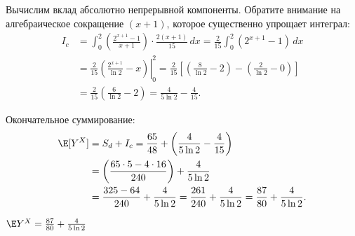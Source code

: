 \begin{Solution}
Вычислим вклад абсолютно непрерывной компоненты. Обратите внимание на алгебраическое сокращение $(x+1)$, которое существенно упрощает интеграл:
\begin{align*}
    I_c &= \int_{0}^{2} \left( \frac{2^{x+1} - 1}{x+1} \right) \cdot \frac{2(x+1)}{15} \, dx = \frac{2}{15} \int_{0}^{2} (2^{x+1} - 1) \, dx \\
    &= \frac{2}{15} \left. \left( \frac{2^{x+1}}{\ln 2} - x \right) \right|_{0}^{2} = \frac{2}{15} \left[ \left( \frac{8}{\ln 2} - 2 \right) - \left( \frac{2}{\ln 2} - 0 \right) \right] \\
    &= \frac{2}{15} \left( \frac{6}{\ln 2} - 2 \right) = \frac{4}{5 \ln 2} - \frac{4}{15}.
\end{align*}

Окончательное суммирование:
\begin{align*}
    \E[Y^X] &= S_d + I_c = \frac{65}{48} + \left( \frac{4}{5 \ln 2} - \frac{4}{15} \right) \\
    &= \left( \frac{65 \cdot 5 - 4 \cdot 16}{240} \right) + \frac{4}{5 \ln 2} \\
    &= \frac{325 - 64}{240} + \frac{4}{5 \ln 2} = \frac{261}{240} + \frac{4}{5 \ln 2} = \frac{87}{80} + \frac{4}{5 \ln 2}.
\end{align*}
\end{Solution}

\begin{Answer}
$\E Y^X = \frac{87}{80} + \frac{4}{5 \ln 2}$
\end{Answer}
